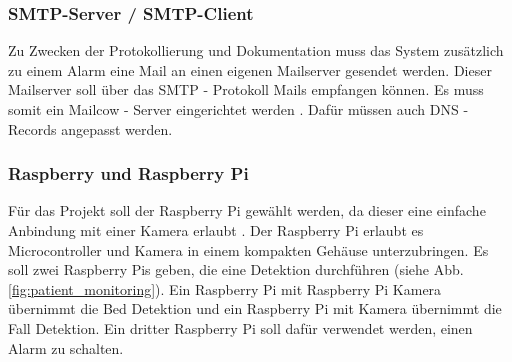 \subsubsection{SMTP-Server / SMTP-Client}
Zu Zwecken der Protokollierung und Dokumentation muss das System zusätzlich zu einem Alarm eine Mail an einen eigenen Mailserver gesendet werden. Dieser Mailserver soll über das SMTP - Protokoll Mails empfangen können. Es muss somit ein Mailcow - Server eingerichtet werden  \cite{Mailcow} . Dafür müssen auch DNS - Records angepasst werden. 

\subsubsection{Raspberry und Raspberry Pi} \label{sec:raspi}
Für das Projekt soll der Raspberry Pi gewählt werden, da dieser eine einfache Anbindung mit einer Kamera erlaubt \cite{Raspberry}  \cite{Raspberry_camera}. Der Raspberry Pi erlaubt es Microcontroller und Kamera in einem kompakten Gehäuse unterzubringen.  Es soll zwei Raspberry Pis geben, die eine Detektion  durchführen (siehe Abb. \ref{fig:patient_monitoring}). Ein Raspberry Pi mit Raspberry Pi Kamera übernimmt die Bed Detektion und ein Raspberry Pi mit Kamera übernimmt die Fall Detektion. Ein dritter Raspberry Pi soll  dafür verwendet werden,  einen Alarm zu schalten. 

